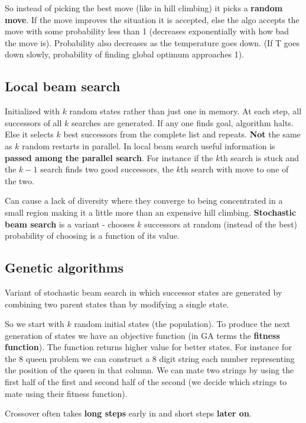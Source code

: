 So instead of picking the best move (like in hill climbing) it picks a \textbf{random move}. If the move improves the situation it is accepted, else the algo accepts the move with some probability less than 1 (decreases exponentially with how bad the move is). Probability also decreases as the temperature goes down. (If T goes down slowly, probability of finding global optimum approaches 1).


\subsection{Local beam search}
Initialized with $k$ random states rather than just one in memory. At each step, all successors of all $k$ searches are generated. If any one finds goal, algorithm halts. Else it selects $k$ best successors from the complete list and repeats. \textbf{Not} the same as $k$ random restarts in parallel. In local beam search useful information is \textbf{passed among the parallel search}. For instance if the $k$th search is stuck and the  $k-1$ search finds two good successors, the $k$th search with move to one of the two.

Can cause a lack of diversity where they converge to being concentrated in a small region making it a little more than an expensive hill climbing. \textbf{Stochastic beam search} is a variant - chooses $k$ successors at random (instead of the best) probability of choosing is a function of its value.


\subsection{Genetic algorithms}
Variant of stochastic beam search in which successor states are generated by combining two parent states than by modifying a single state.

So we start with $k$ random initial states (the population). To produce the next generation of states we have an objective function (in GA terms the \textbf{fitness function}). The function returns higher value for better states. For instance for the 8 queen problem we can construct a 8 digit string each number representing the position of the queen in that column. We can mate two strings by using the first half of the first and second half of the second (we decide which strings to mate using their fitness function). 

Crossover often takes \textbf{long steps}  early in and short steps \textbf{later on}.






